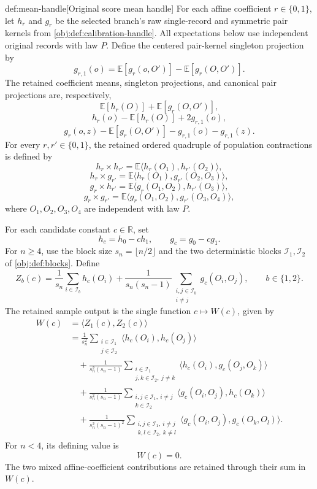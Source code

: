 \documentclass[11pt]{article}
\begin{document}
\begin{algorithmv}{def:mean-handle}[Original score mean handle]
For each affine coefficient \(r\in\{0,1\}\), let \(h_r\) and \(g_r\) be the selected branch's raw single-record and symmetric pair kernels from \cref{obj:def:calibration-handle}. All expectations below use independent original records with law \(P\). Define the centered pair-kernel singleton projection by
\[
g_{r,1}(o)
=
\mathbb E[g_r(o,O')]
-\mathbb E[g_r(O,O')].
\]
The retained coefficient means, singleton projections, and canonical pair projections are, respectively,
\[
\mathbb E[h_r(O)]+\mathbb E[g_r(O,O')],
\]
\[
h_r(o)-\mathbb E[h_r(O)]+2g_{r,1}(o),
\]
\[
g_r(o,z)-\mathbb E[g_r(O,O')]
-g_{r,1}(o)-g_{r,1}(z).
\]
For every \(r,r'\in\{0,1\}\), the retained ordered quadruple of population contractions is defined by
\[
h_r\!\times h_{r'}
=
\mathbb E\langle h_r(O_1),h_{r'}(O_2)\rangle,
\]
\[
h_r\!\times g_{r'}
=
\mathbb E\langle h_r(O_1),g_{r'}(O_2,O_3)\rangle,
\]
\[
g_r\!\times h_{r'}
=
\mathbb E\langle g_r(O_1,O_2),h_{r'}(O_3)\rangle,
\]
\[
g_r\!\times g_{r'}
=
\mathbb E\langle g_r(O_1,O_2),g_{r'}(O_3,O_4)\rangle,
\]
where \(O_1,O_2,O_3,O_4\) are independent with law \(P\).

For each candidate constant \(c\in\mathbb R\), set
\[
h_c=h_0-ch_1,
\qquad
g_c=g_0-cg_1.
\]
For \(n\ge4\), use the block size \(s_n=\lfloor n/2\rfloor\) and the two deterministic blocks \(\mathcal I_1,\mathcal I_2\) of \cref{obj:def:blocks}. Define
\[
Z_b(c)=
\frac1{s_n}\sum_{i\in\mathcal I_b}h_c(O_i)
+
\frac1{s_n(s_n-1)}
\sum_{\substack{i,j\in\mathcal I_b\\i\ne j}}
g_c(O_i,O_j),
\qquad b\in\{1,2\}.
\]
The retained sample output is the single function \(c\mapsto W(c)\), given by
\[
\begin{aligned}
W(c)
&=\langle Z_1(c),Z_2(c)\rangle\\
&=\frac1{s_n^2}
\sum_{\substack{i\in\mathcal I_1\\j\in\mathcal I_2}}
\langle h_c(O_i),h_c(O_j)\rangle\\
&\quad+\frac1{s_n^2(s_n-1)}
\sum_{\substack{i\in\mathcal I_1\\j,k\in\mathcal I_2,\ j\ne k}}
\langle h_c(O_i),g_c(O_j,O_k)\rangle\\
&\quad+\frac1{s_n^2(s_n-1)}
\sum_{\substack{i,j\in\mathcal I_1,\ i\ne j\\k\in\mathcal I_2}}
\langle g_c(O_i,O_j),h_c(O_k)\rangle\\
&\quad+\frac1{s_n^2(s_n-1)^2}
\sum_{\substack{i,j\in\mathcal I_1,\ i\ne j\\k,l\in\mathcal I_2,\ k\ne l}}
\langle g_c(O_i,O_j),g_c(O_k,O_l)\rangle.
\end{aligned}
\]
For \(n<4\), its defining value is
\[
W(c)=0.
\]
The two mixed affine-coefficient contributions are retained through their sum in \(W(c)\).
\end{algorithmv}
\end{document}
